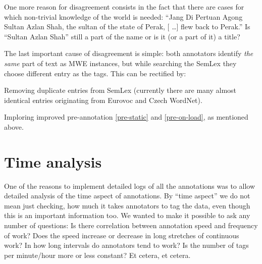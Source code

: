 One more reason for disagreement consists in the fact that there are cases for which non-trivial knowledge of the world is needed: ``Jang Di Pertuan Agong Sultan Azlan Shah, the sultan of the state of Perak, [\kern 2pt \ldots] flew back to Perak.'' Is ``Sultan Azlan Shah'' still a part of the name or is it (or a part of it) a title?

The last important cause of disagreement is simple: both annotators identify \emph{the same} part of text as MWE instances, but while searching the SemLex they choose different entry as the tags. This can be rectified by:
	\begin{compactitem}
		\item Removing duplicate entries from SemLex (currently there are many almost identical entries originating from Eurovoc and Czech WordNet).
		\item Imploring improved pre-annotation \ref{pre-static} and \ref{pre-on-load}, as mentioned above.
	\end{compactitem}



\section{Time analysis}
One of the reasons to implement detailed logs of all the annotations  was to allow detailed analysis of the time aspect of annotations. By ``time aspect'' we do not mean just checking, how much it takes annotators to tag the data, even though this is an important information too. We wanted to make it possible to ask any number of questions: Is there correlation between annotation speed and frequency of work? Does the speed increase or decrease in long stretches of continuous work? In how long intervals do annotators tend to work? Is the number of tags per minute/hour more or less constant? Et cetera, et cetera. 

\todo {}

